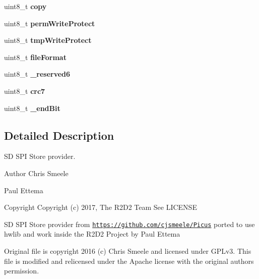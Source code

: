 \begin{DoxyCompactItemize}
uint8\+\_\+t {\bfseries copy}
\item 
\mbox{\label{sd-spi_8cc_abd25a030c5ca3c66cbd548cd1ee0ab4f}} 
uint8\+\_\+t {\bfseries perm\+Write\+Protect}
\item 
\mbox{\label{sd-spi_8cc_a26aaca9a408a293c2c021701199a686c}} 
uint8\+\_\+t {\bfseries tmp\+Write\+Protect}
\item 
\mbox{\label{sd-spi_8cc_afa318ea025b4c0f3078220051cb34222}} 
uint8\+\_\+t {\bfseries file\+Format}
\item 
\mbox{\label{sd-spi_8cc_a3bd4f1524a863a283ab87cddd99e1935}} 
uint8\+\_\+t {\bfseries \+\_\+reserved6}
\item 
\mbox{\label{sd-spi_8cc_a2bb48654c986c72b5979b9be82ad5fbc}} 
uint8\+\_\+t {\bfseries crc7}
\item 
\mbox{\label{sd-spi_8cc_aa3665e83385c8c805aa543bf16ee1528}} 
uint8\+\_\+t {\bfseries \+\_\+end\+Bit}
\end{DoxyCompactItemize}


\subsection{Detailed Description}
SD S\+PI Store provider. 

\begin{DoxyAuthor}{Author}
Chris Smeele 

Paul Ettema 
\end{DoxyAuthor}
\begin{DoxyCopyright}{Copyright}
Copyright (c) 2017, The R2\+D2 Team  See L\+I\+C\+E\+N\+SE
\end{DoxyCopyright}
SD S\+PI Store provider from \href{https://github.com/cjsmeele/Picus}{\tt https\+://github.\+com/cjsmeele/\+Picus} ported to use hwlib and work inside the R2\+D2 Project by Paul Ettema

Original file is copyright 2016 (c) Chris Smeele and licensed under G\+P\+Lv3. This file is modified and relicensed under the Apache license with the original author\textquotesingle{}s permission. 